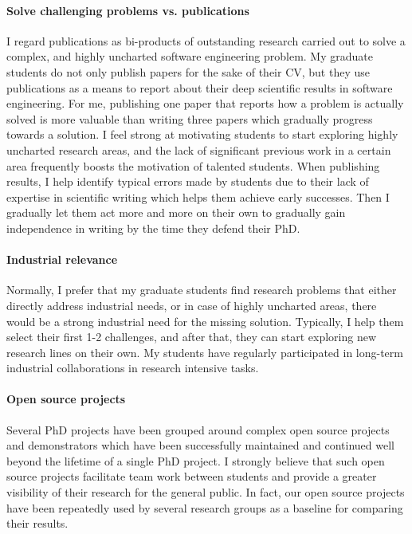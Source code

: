 \paragraph{Solve challenging problems vs. publications}
I regard publications as bi-products of outstanding research carried out to solve a complex, and highly uncharted software engineering problem. My graduate students do not only publish papers for the sake of their CV, but they use publications as a means to report about their deep scientific results in software engineering. For me, publishing one paper that reports how a problem is actually solved is more valuable than writing three papers which gradually progress towards a solution. I feel strong at motivating students to start exploring highly uncharted research areas, and the lack of significant previous work in a certain area frequently boosts the motivation of talented students. 
When publishing results, I help identify typical errors made by students due to their lack of expertise in scientific writing which helps them achieve early successes. Then I gradually let them act more and more on their own to gradually gain independence in writing by the time they defend their PhD. 

\paragraph{Industrial relevance}
Normally, I prefer that my graduate students find research problems that either directly address industrial needs, or in case of highly uncharted areas, there would be a strong industrial need for the missing solution. Typically, I help them select their first 1-2 challenges, and after that, they can start exploring new research lines on their own. 
My students have regularly participated in long-term industrial collaborations in research intensive tasks. 

\paragraph{Open source projects}
Several PhD projects have been grouped around complex open source projects and demonstrators which have been successfully maintained and continued well beyond the lifetime of a single PhD project. I strongly believe that such open source projects facilitate team work between students and provide a greater visibility of their research for the general public. In fact, our open source projects have been repeatedly used by several research groups as a baseline for comparing their results. 


